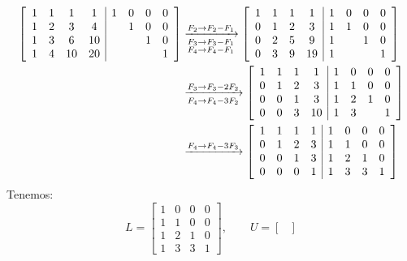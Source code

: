 \begin{enumerate}[label=\color{red}\textbf{\arabic*)}]
$$\begin{aligned}
    \left[ \begin{array}{cccc|cccc}
            1 & 1 & 1 & 1 & 1 & 0 & 0 & 0\\
            1 & 2 & 3 & 4 &  & 1 & 0 & 0\\
            1 & 3 & 6 & 10 &  &  & 1 & 0\\
            1 & 4 & 10 & 20 &  &  &  & 1\\
        \end{array} \right]& \xrightarrow[\begin{subarray}{l}
            F_3\to F_3-F_1\\
            F_4\to F_4-F_1
    \end{subarray}]{F_2\to F_2-F_1}\left[ \begin{array}{cccc|cccc}
            1 & 1 & 1 & 1 & 1 & 0 & 0 & 0\\
            0 & 1 & 2 & 3 & 1 & 1 & 0 & 0\\
            0 & 2 & 5 & 9 & 1 &  & 1 & 0\\
            0 & 3 & 9 & 19 & 1 & & & 1
    \end{array} \right] \\
    &\xrightarrow[F_4\to F_4-3F_2]{F_3\to F_3-2F_2} \left[ \begin{array}{cccc|cccc}
            1 & 1 & 1 & 1 & 1 & 0 & 0 & 0\\
            0 & 1 & 2 & 3 & 1 & 1 & 0 & 0\\
            0 & 0 & 1 & 3 & 1 & 2 & 1 & 0\\
            0 & 0 & 3 & 10 & 1 & 3 & & 1
    \end{array} \right] \\
    &\xrightarrow{F_4\to F_4-3F_3}\left[ \begin{array}{cccc|cccc}
            1 & 1 & 1 & 1 & 1 & 0 & 0 & 0\\
            0 & 1 & 2 & 3 & 1 & 1 & 0 & 0\\
            0 & 0 & 1 & 3 & 1 & 2 & 1 & 0\\
            0 & 0 & 0 & 1 & 1 & 3 & 3 & 1 
    \end{array} \right] 
\end{aligned}$$
Tenemos: \[
L=\begin{bmatrix} 
    1 & 0 & 0 & 0\\
    1 & 1 & 0 & 0\\
    1 & 2 & 1 & 0\\
    1 & 3 & 3 & 1
\end{bmatrix}, \qquad U=\begin{bmatrix} 

\end{bmatrix}\]
\end{enumerate}
